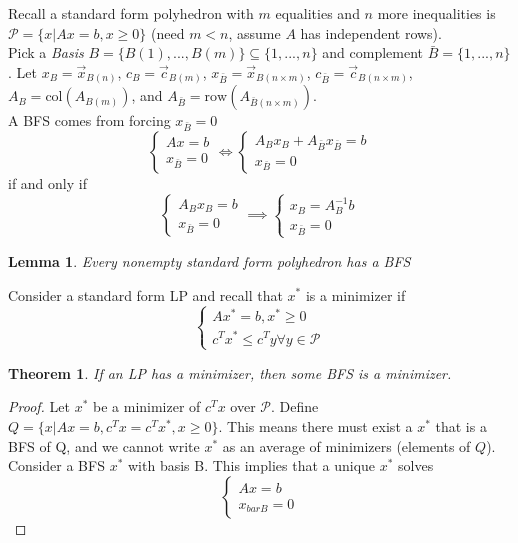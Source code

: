 \documentclass[12pt,oneside]{book}
\numberwithin{equation}{section}
\theoremstyle{definition}
\theoremstyle{plain}
\newtheorem{theorem}{Theorem}[section]
\newtheorem{lemma}{Lemma}[section]
\theoremstyle{remark}
\newcommand{\poly}{\mathcal{P}}
\begin{document}
Recall a standard form polyhedron with $m$ equalities and $n$ more inequalities is $\poly = \{x | Ax=b,x\ge0\}$ (need $m < n$, assume $A$ has independent rows). \\
\noindent Pick a \emph{Basis} $B = \{B(1),...,B(m)\} \subseteq \{1,...,n\}$ and complement $\bar{B}=\{1,...,n\}$. Let $x_B=\vec{x}_{B(n)}$, $c_B=\vec{c}_{B(m)}$, $x_{\bar{B}}=\vec{x}_{B(n \times m)}$, $c_{\bar{B}}=\vec{c}_{B(n \times m)}$, $A_B=\text{col}(A_{B(m)})$, and $A_{\bar{B}}=\text{row}(A_{\bar{B}(n \times m)})$. \\
\noindent A BFS comes from forcing $x_{\bar{B}}=0$
$$
\begin{cases}
    Ax=b\\
    x_{\bar{B}}=0
\end{cases}
\iff
\begin{cases}
    A_B x_B + A_{\bar{B}}x_{\bar{B}}=b \\
    x_{\bar{B}}=0
\end{cases}
$$
if and only if
$$
\begin{cases}
    A_B x_B=b \\
    x_{\bar{B}}=0
\end{cases}
\implies
\begin{cases}
    x_B = A_B^{-1}b\\
    x_{\bar{B}}=0
\end{cases}
$$
\begin{lemma}
    Every nonempty standard form polyhedron has a BFS
\end{lemma}
Consider a standard form LP and recall that $x^*$ is a minimizer if
$$
\begin{cases}
    Ax^* = b, x^* \ge 0 \\
    c^Tx^* \le c^T y \forall y \in \poly
\end{cases}
$$
\begin{theorem}
    If an LP has a minimizer, then some BFS is a minimizer.
\end{theorem}
\begin{proof}
    Let $x^*$ be a minimizer of $c^Tx$ over $\poly$. Define $Q = \{x | Ax=b, c^Tx=c^Tx^*, x\ge0\}$. This means there must exist a $x^*$ that is a BFS of Q, and we cannot write $x^*$ as an average of minimizers (elements of $Q$). Consider a BFS $x^*$ with basis B. This implies that a unique $x^*$ solves
    $$
    \begin{cases}
        Ax=b \\
        x_{bar{B}}=0
    \end{cases}
    $$
\end{proof}
\end{document}
